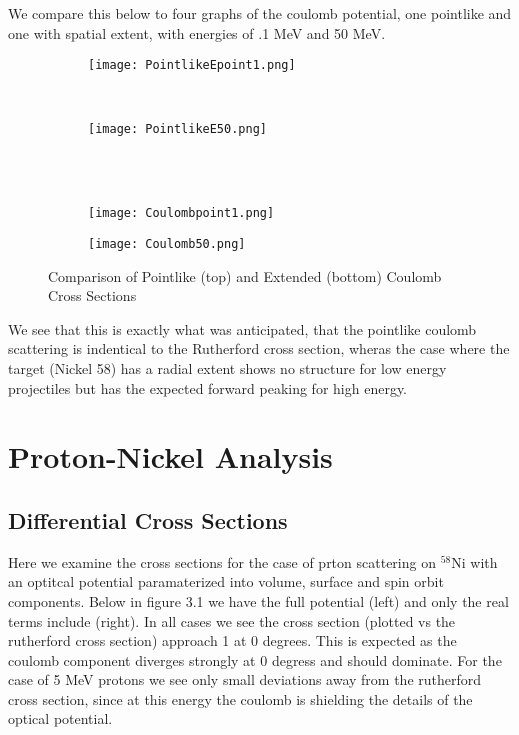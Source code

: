 \documentclass[paper=a4, fontsize=11pt]{scrartcl} %
\numberwithin{equation}{section} %
\numberwithin{figure}{section} %
\numberwithin{table}{section} %
\begin{document}
We compare this below to four graphs of the coulomb potential, one pointlike and one with spatial extent, with energies of .1 MeV and 50 MeV.\\

 \begin{figure}[hbt]
        \centering
        \begin{subfigure}[b!]{0.45\textwidth}
                \texttt{[image: PointlikeEpoint1.png]}
        \end{subfigure}%
        ~ %
\quad
        \begin{subfigure}[b!]{0.45\textwidth}
                \texttt{[image: PointlikeE50.png]}
        \end{subfigure}
\\
        ~ %
        \begin{subfigure}[b]{0.45\textwidth}
                \texttt{[image: Coulombpoint1.png]}
        \end{subfigure}
\quad
        \begin{subfigure}[b]{0.45\textwidth}
                \texttt{[image: Coulomb50.png]}
        \end{subfigure}

        \caption{Comparison of Pointlike (top) and Extended (bottom) Coulomb Cross Sections }
\end{figure}

We see that this is exactly what was anticipated, that the pointlike coulomb scattering is indentical to the Rutherford cross section, wheras the case where the target (Nickel 58) has a radial extent shows no structure for low energy projectiles but has the expected forward peaking for high energy. \\
\newpage

\section{Proton-Nickel Analysis}
\subsection{Differential Cross Sections}

Here we examine the cross sections for the case of prton scattering on $^{58}$Ni with an optitcal potential paramaterized into volume, surface and spin orbit components.  Below in figure 3.1 we have the full potential (left) and only the real terms include (right).  In all cases we see the cross section (plotted vs the rutherford cross section) approach 1 at 0 degrees.  This is expected as the coulomb component diverges strongly at 0 degress and should dominate.  For the case of 5 MeV protons we see only small deviations away from the rutherford cross section, since at this energy the coulomb is shielding the details of the optical potential.   
\end{document}
